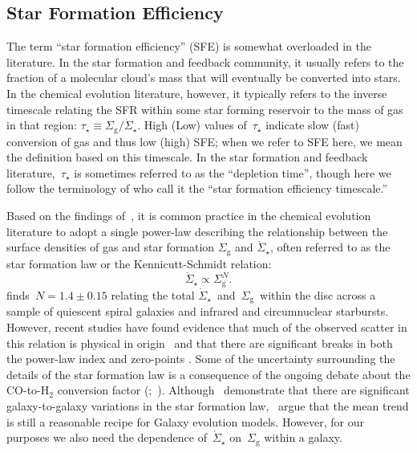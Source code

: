 \subsection{Star Formation Efficiency} 
\label{migration:sec:methods:sfe} 
The term ``star formation efficiency'' (SFE) is somewhat overloaded in the 
literature. 
In the star formation and feedback community, it usually refers to the fraction 
of a molecular cloud's mass that will eventually be converted into stars. 
In the chemical evolution literature, however, it typically refers to the 
inverse timescale relating the SFR within some star forming reservoir to the 
mass of gas in that region: 
$\tau_\star \equiv \Sigma_\text{g}/\dot{\Sigma}_\star$. 
High (Low) values of~$\tau_\star$ indicate slow (fast) conversion of gas and 
thus low (high) SFE; when we refer to SFE here, we mean the definition based on 
this timescale. 
In the star formation and feedback literature,~$\tau_\star$ is sometimes 
referred to as the ``depletion time'', though here we follow the terminology of 
\citet{Weinberg2017b} who call it the ``star formation efficiency timescale.'' 
\par 
Based on the findings of~\citet{Kennicutt1998}, it is common practice in the 
chemical evolution literature to adopt a single power-law describing the 
relationship between the surface densities of gas and star formation 
$\Sigma_\text{g}$ and $\dot{\Sigma}_\star$, often referred to as the star 
formation law or the Kennicutt-Schmidt relation: 
\begin{equation} 
\dot{\Sigma}_\star \propto \Sigma_\text{g}^N. 
\end{equation} 
\citet{Kennicutt1998} finds~$N = 1.4 \pm 0.15$ relating the total 
$\dot{\Sigma}_\star$~and~$\Sigma_\text{g}$~within the disc across a sample of 
quiescent spiral galaxies and infrared and circumnuclear starbursts. 
However, recent studies have found evidence that much of the observed scatter 
in this relation is physical in origin~\citep{delosReyes2019} and that there 
are significant breaks in both the power-law index and zero-points 
\citep{Kennicutt2021}. 
Some of the uncertainty surrounding the details of the star formation law is a 
consequence of the ongoing debate about the CO-to-H$_2$ conversion factor 
(\citealp{Kennicutt2012};~\citealp*{Liu2015}). 
Although~\citet{Ellison2021} demonstrate that there are significant 
galaxy-to-galaxy variations in the star formation law,~\citet{delosReyes2019} 
argue that the mean trend is still a reasonable recipe for Galaxy evolution 
models. 
However, for our purposes we also need the dependence of~$\dot{\Sigma}_\star$ 
on~$\Sigma_\text{g}$ within a galaxy. 

